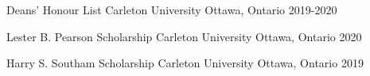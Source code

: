 


\begin{cvhonors}
  \cvhonor
    {Deans' Honour List} %
    {Carleton University} %
    {Ottawa, Ontario} %
    {2019-2020} %

  \cvhonor
    {Lester B. Pearson Scholarship} %
    {Carleton University} %
    {Ottawa, Ontario} %
    {2020} %

  \cvhonor
    {Harry S. Southam Scholarship} %
    {Carleton University} %
    {Ottawa, Ontario} %
    {2019} %


\end{cvhonors}
